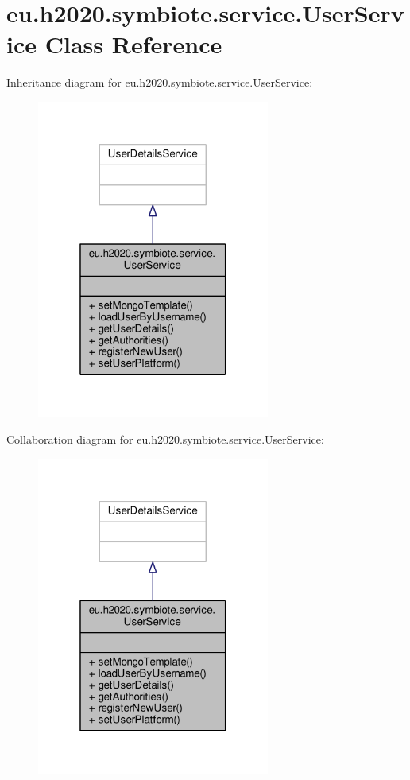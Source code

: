 \hypertarget{classeu_1_1h2020_1_1symbiote_1_1service_1_1UserService}{}\section{eu.\+h2020.\+symbiote.\+service.\+User\+Service Class Reference}
\label{classeu_1_1h2020_1_1symbiote_1_1service_1_1UserService}


Inheritance diagram for eu.\+h2020.\+symbiote.\+service.\+User\+Service\+:
\nopagebreak
\begin{figure}[H]
\begin{center}
\leavevmode
\includegraphics[width=217pt]{classeu_1_1h2020_1_1symbiote_1_1service_1_1UserService__inherit__graph}
\end{center}
\end{figure}


Collaboration diagram for eu.\+h2020.\+symbiote.\+service.\+User\+Service\+:
\nopagebreak
\begin{figure}[H]
\begin{center}
\leavevmode
\includegraphics[width=217pt]{classeu_1_1h2020_1_1symbiote_1_1service_1_1UserService__coll__graph}
\end{center}
\end{figure}
